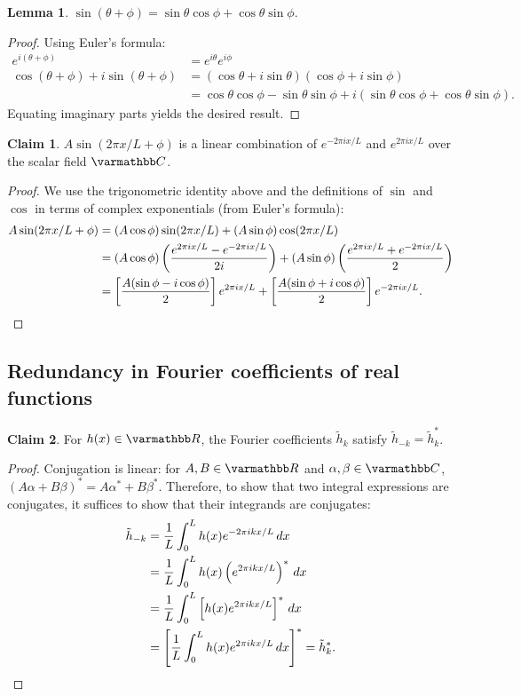\documentclass{article}
\renewcommand{\mathbb}{\varmathbb}
\theoremstyle{definition}
\newtheorem*{claim}{Claim}
\newtheorem*{lemma}{Lemma}
\begin{document}
\begin{lemma}
$\sin(\theta + \phi) = \sin\theta\cos\phi + \cos\theta\sin\phi.$
\end{lemma}
\begin{proof}
Using Euler's formula:
\begin{align*}
e^{i(\theta + \phi)} &= e^{i\theta} e^{i\phi} \\
\cos(\theta + \phi) + i \sin(\theta + \phi)
&= (\cos\theta + i \sin\theta)(\cos\phi + i \sin\phi)
\\&=
\cos\theta\cos\phi - \sin\theta\sin\phi
+ i(\sin\theta\cos\phi + \cos\theta\sin\phi).
\end{align*}
Equating imaginary parts yields the desired result.
\end{proof}

\begin{claim}
$A \sin(2\pi x / L + \phi)$ is a linear combination of
$e^{-2\pi i x / L}$ and
$e^{2\pi i x / L}$ over the scalar field $\mathbb C$.
\end{claim}
\begin{proof}
We use the trigonometric identity
above and the definitions of $\sin$ and $\cos$
in terms of complex exponentials (from Euler's formula):
\begin{align*}
A \sin(2\pi x / L + \phi) &= (A \cos\phi) \sin(2\pi x / L)
+ (A\sin\phi) \cos(2\pi x / L)
\\&=
(A\cos\phi) \left(e^{2\pi i x / L} - e^{-2\pi i x / L} \over 2i\right)
+ (A\sin\phi) \left(e^{2\pi i x / L} + e^{-2\pi i x / L} \over 2\right)
\\&=
\left[A (\sin\phi - i \cos\phi) \over 2\right] e^{2\pi i x / L} 
+ \left[A (\sin\phi + i \cos\phi) \over 2\right] e^{-2\pi i x / L}. 
\end{align*}
\end{proof}

\subsection{Redundancy in Fourier coefficients of real functions}

\begin{claim}
For $h(x) \in \mathbb R$, the Fourier coefficients $\tilde h_k$ satisfy
$\tilde h_{-k} = \tilde h^*_k$.
\end{claim}

\begin{proof}
Conjugation is linear: for $A, B \in \mathbb R$ and
$\alpha, \beta \in \mathbb C$, $(A\alpha + B\beta)^* = A\alpha^*
+ B\beta^*$. Therefore, to show that two integral expressions are
conjugates, it suffices to show that their integrands are conjugates:
\begin{align*}
\tilde h_{-k} &= {1 \over L} \int_0^L h(x) e^{-2\pi ikx/L} \, dx
\\&= {1 \over L} \int_0^L h(x) \left(e^{2\pi ikx/L}\right)^* \, dx
\\&= {1 \over L} \int_0^L \left[h(x) e^{2\pi ikx/L}\right]^* \, dx
\\&= \left[ {1 \over L} \int_0^L h(x) e^{2\pi ikx/L} \, dx \right]^*
= \tilde h_k^*.
\end{align*}
\end{proof}
\end{document}
